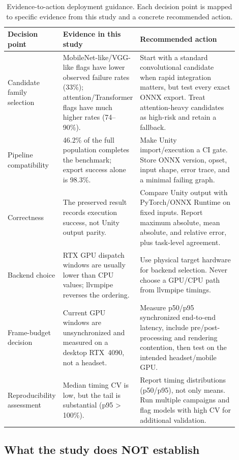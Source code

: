 \documentclass[10pt,twocolumn,letterpaper]{article}
\begin{document}
\begin{table}[t]
\centering\small
\begin{tabular}{p{0.18\linewidth}p{0.26\linewidth}p{0.46\linewidth}}
\toprule
Decision point & Evidence in this study & Recommended action \\
\midrule
Candidate family selection & MobileNet-like/VGG-like flags have lower observed failure rates (33\%); attention/Transformer flags have much higher rates (74--90\%). & Start with a standard convolutional candidate when rapid integration matters, but test every exact ONNX export. Treat attention-heavy candidates as high-risk and retain a fallback. \\
\midrule
Pipeline compatibility & 46.2\% of the full population completes the benchmark; export success alone is 98.3\%. & Make Unity import/execution a CI gate. Store ONNX version, opset, input shape, error trace, and a minimal failing graph. \\
\midrule
Correctness & The preserved result records execution success, not Unity output parity. & Compare Unity output with PyTorch/ONNX Runtime on fixed inputs. Report maximum absolute, mean absolute, and relative error, plus task-level agreement. \\
\midrule
Backend choice & RTX GPU dispatch windows are usually lower than CPU values; llvmpipe reverses the ordering. & Use physical target hardware for backend selection. Never choose a GPU/CPU path from llvmpipe timings. \\
\midrule
Frame-budget decision & Current GPU windows are unsynchronized and measured on a desktop RTX~4090, not a headset. & Measure p50/p95 synchronized end-to-end latency, include pre/post-processing and rendering contention, then test on the intended headset/mobile GPU. \\
\midrule
Reproducibility assessment & Median timing CV is low, but the tail is substantial (p95 > 100\%). & Report timing distributions (p50/p95), not only means. Run multiple campaigns and flag models with high CV for additional validation. \\
\bottomrule
\end{tabular}
\caption{Evidence-to-action deployment guidance. Each decision point is mapped to specific evidence from this study and a concrete recommended action.}
\label{tab:guidance}
\end{table}

\subsection{What the study does NOT establish}
\end{document}
